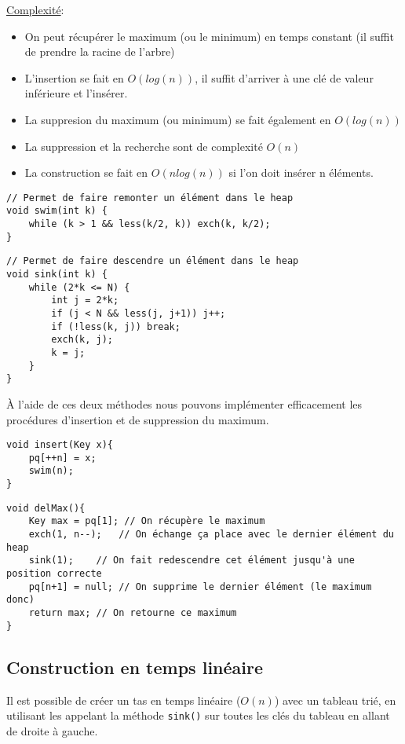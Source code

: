 \documentclass[10pt]{article}
\begin{document}
\underline{Complexité}:
\begin{itemize}
\item On peut récupérer le maximum (ou le minimum) en temps constant (il suffit de prendre la racine de l'arbre)
\item L'insertion se fait en $O(log(n))$, il suffit d'arriver à une clé de valeur inférieure et l'insérer.
\item La suppresion du maximum (ou minimum) se fait également en $O(log(n))$
\item La suppression et la recherche sont de complexité $O(n)$
\item La construction se fait en $O(nlog(n))$ si l'on doit insérer n éléments.
\end{itemize} 

\begin{verbatim}
// Permet de faire remonter un élément dans le heap
void swim(int k) {
	while (k > 1 && less(k/2, k)) exch(k, k/2);
}
\end{verbatim}


\begin{verbatim}
// Permet de faire descendre un élément dans le heap
void sink(int k) {
	while (2*k <= N) {
		int j = 2*k;
		if (j < N && less(j, j+1)) j++;
		if (!less(k, j)) break;
		exch(k, j);
		k = j;	
	}
}
\end{verbatim}

À l'aide de ces deux méthodes nous pouvons implémenter efficacement les procédures d'insertion et de suppression du maximum.

\begin{verbatim}
void insert(Key x){
	pq[++n] = x;
	swim(n);
}
\end{verbatim}

\begin{verbatim}
void delMax(){
	Key max = pq[1]; // On récupère le maximum
	exch(1, n--);	// On échange ça place avec le dernier élément du heap
	sink(1);	// On fait redescendre cet élément jusqu'à une position correcte
	pq[n+1] = null; // On supprime le dernier élément (le maximum donc)
	return max; // On retourne ce maximum
}
\end{verbatim}

\subsection{Construction en temps linéaire}
Il est possible de créer un tas en temps linéaire ($O(n)$) avec un tableau trié, en utilisant les appelant la méthode \verb|sink()| sur toutes les clés du tableau en allant de droite à gauche. 
\end{document}
